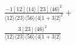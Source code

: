 \documentclass[varwidth, border=5pt]{standalone}
\begin{document}
\begin{my}
$\begin{gathered}
\scriptscriptstyle\frac{-1[12]⟨14⟩[23]⟨46⟩^2}{⟨12⟩⟨23⟩⟨56⟩⟨4|1+3|2]^2}+\\
\scriptscriptstyle\frac{3[23]⟨46⟩^2}{⟨12⟩⟨23⟩⟨56⟩⟨4|1+3|2]}\phantom{+}
\end{gathered}$
\end{my}
\end{document}
